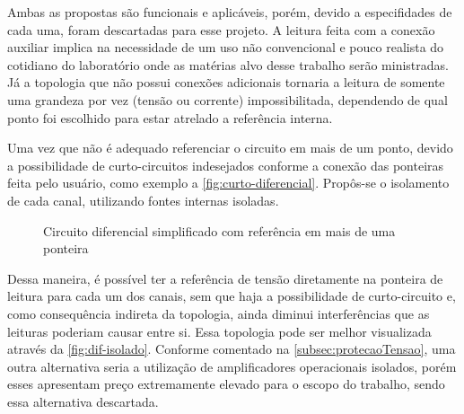 Ambas as propostas são funcionais e aplicáveis, porém, devido a especifidades de cada uma, foram descartadas para esse projeto. A leitura feita com a conexão auxiliar implica na necessidade de um uso não convencional e pouco realista do cotidiano do laboratório onde as matérias alvo desse trabalho serão ministradas. Já a topologia que não possui conexões adicionais tornaria a leitura de somente uma grandeza por vez (tensão ou corrente) impossibilitada, dependendo de qual ponto foi escolhido para estar atrelado a referência interna.

Uma vez que não é adequado referenciar o circuito em mais de um ponto, devido a possibilidade de curto-circuitos indesejados conforme a conexão das ponteiras feita pelo usuário, como exemplo a \autoref{fig:curto-diferencial}. Propôs-se o isolamento de cada canal, utilizando fontes internas isoladas.

\begin{figure}[htb!]
    \caption{Circuito diferencial simplificado com referência em mais de uma ponteira}
    \vspace*{5mm}
    \label{fig:curto-diferencial}
    \fonte{}
\end{figure}

Dessa maneira, é possível ter a referência de tensão diretamente na ponteira de leitura para cada um dos canais, sem que haja a possibilidade de curto-circuito e, como consequência indireta da topologia, ainda diminui interferências que as leituras poderiam causar entre si. Essa topologia pode ser melhor visualizada através da \autoref{fig:dif-isolado}.
Conforme comentado na \autoref{subsec:protecaoTensao}, uma outra alternativa seria a utilização de amplificadores operacionais isolados, porém esses apresentam preço extremamente elevado para o escopo do trabalho, sendo essa alternativa descartada.

